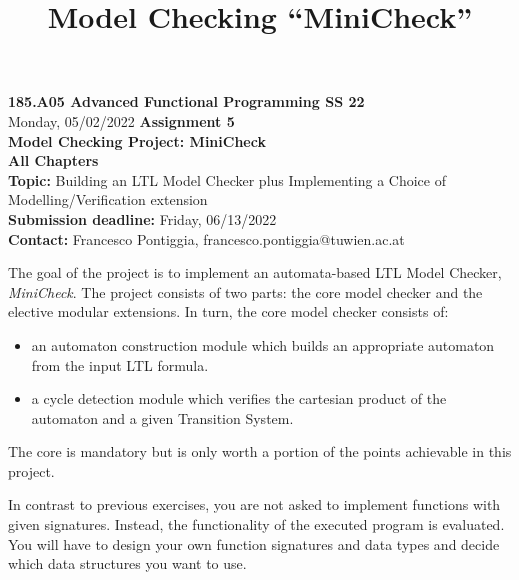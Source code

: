 \documentclass{article}
\title{Model Checking ``MiniCheck''}
\begin{document}
\large
\thispagestyle{empty}
\begin{center}
  {\Large \textbf{185.A05 Advanced Functional Programming SS 22}}  \\ [1ex] 
            Monday, 05/02/2022 
               {\Large \textbf{Assignment 5}} \\[.5ex]
              {\Large \textbf{Model Checking Project: MiniCheck}} \\[.5ex]
                 \textbf{All Chapters}  \\ [.75ex]
           \textbf{Topic:} Building an LTL Model Checker plus Implementing a Choice of Modelling/Verification extension  \\[1ex]
          \textbf{Submission deadline:} Friday, 06/13/2022  \\
          \textbf{Contact:} Francesco Pontiggia, francesco.pontiggia@tuwien.ac.at
\end{center}

\vspace{1ex}
\noindent
\noindent





\newcommand{\code}[1]{\texttt{#1}}

\noindent
The goal of the project is to implement an automata-based LTL Model Checker, \textit{MiniCheck}. 
The project consists of two parts: the core model checker and the elective modular extensions. 
In turn, the core model checker consists of: 
\begin{itemize}
    \item an automaton construction module which builds an appropriate automaton from the input LTL formula.
    \item a cycle detection module which verifies the cartesian product of the automaton and a given Transition System.
\end{itemize}  
The core is mandatory but is only worth a portion of the points achievable in this project.

In contrast to previous exercises, you are not asked to implement functions with given signatures. 
Instead, the functionality of the executed program is evaluated. 
You will have to design your own function signatures and data types and decide 
which data structures you want to use.
\end{document}
